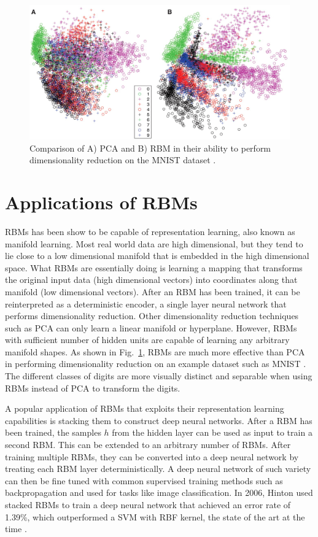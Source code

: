 \documentclass[journal]{IEEEtran}
\begin{document}
\begin{figure}[h]
  \centering
  \includegraphics[width=0.9\linewidth]{reduce.jpg}
  \caption{Comparison of A) PCA and B) RBM in their ability to perform dimensionality reduction on the MNIST dataset \cite{hinton2006reducing}.}
  \label{reduce}
\end{figure}

\section{Applications of RBMs}
RBMs has been show to be capable of representation learning, also known as manifold learning. Most real world data are high dimensional, but they tend to lie close to a low dimensional manifold that is embedded in the high dimensional space. What RBMs are essentially doing is learning a mapping that transforms the original input data (high dimensional vectors) into coordinates along that manifold (low dimensional vectors). After an RBM has been trained, it can be reinterpreted as a deterministic encoder, a single layer neural network that performs dimensionality reduction. Other dimensionality reduction techniques such as PCA can only learn a linear manifold or hyperplane. However, RBMs with sufficient number of hidden units are capable of learning any arbitrary manifold shapes. As shown in Fig.~\ref{reduce}, RBMs are much more effective than PCA in performing dimensionality reduction on an example dataset such as MNIST \cite{deng2012mnist}. The different classes of digits are more visually distinct and separable when using RBMs instead of PCA to transform the digits. 

A popular application of RBMs that exploits their representation learning capabilities is stacking them to construct deep neural networks. After a RBM has been trained, the samples $h$ from the hidden layer can be used as input to train a second RBM. This can be extended to an arbitrary number of RBMs. After training multiple RBMs, they can be converted into a deep neural network by treating each RBM layer deterministically. A deep neural network of such variety can then be fine tuned with common supervised training methods such as backpropagation \cite{hinton2006reducing} and used for tasks like image classification. In 2006, Hinton used stacked RBMs to train a deep neural network that achieved an error rate of 1.39\%, which outperformed a SVM with RBF kernel, the state of the art at the time \cite{hinton2006fast}.
\end{document}
